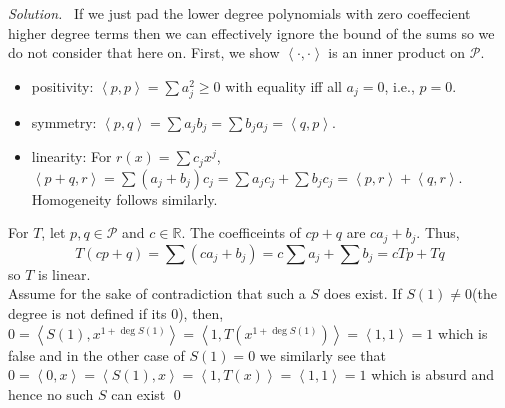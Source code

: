 \documentclass[12pt,a4paper]{article}
\newenvironment{solution}{%
  \par\noindent\textit{Solution.}\ }{\qed}
\theoremstyle{problemstyle}
\def\bR{\mathbb{R}}
\newcommand{\ipp}[1]{{\left\langle{#1}\right\rangle}}
\begin{document}
\begin{solution}
	If we just pad the lower degree polynomials with zero coeffecient higher degree terms then we can effectively ignore the bound of the sums so we do not consider that here on. First, we show $\ipp{\cdot,\cdot}$ is an inner product on $\mathcal{P}$.
\begin{itemize}
    \item positivity: $\ipp{p,p}=\sum a_j^2 \ge 0$ with equality iff all $a_j=0$, i.e., $p=0$.
    \item symmetry: $\ipp{p,q}=\sum a_jb_j = \sum b_ja_j = \ipp{q,p}$.
    \item linearity: For $r(x)=\sum c_jx^j$, $\ipp{p+q,r}=\sum (a_j+b_j)c_j = \sum a_jc_j + \sum b_jc_j = \ipp{p,r}+\ipp{q,r}$. Homogeneity follows similarly.
\end{itemize}
For $T$, let $p,q\in\mathcal{P}$ and $c\in\bR$. The coefficeints of $cp+q$ are $ca_j+b_j$. Thus,
$$T(cp+q)=\sum (ca_j+b_j)=c\sum a_j + \sum b_j = cTp+Tq$$
so $T$ is linear.
\\ Assume for the sake of contradiction that such a $S$ does exist. If $S(1)\neq 0$(the degree is not defined if its $0$), then, $0=\ipp{S(1),x^{1+\deg S(1)}}=\ipp{1,T(x^{1+\deg S(1)})}=\ipp{1,1}=1$ which is false and in the other case of $S(1)=0$ we similarly see that $0=\ipp{0,x}=\ipp{S(1),x}=\ipp{1,T(x)}=\ipp{1,1}=1$ which is absurd and hence no such $S$ can exist
\end{solution}
\end{document}
